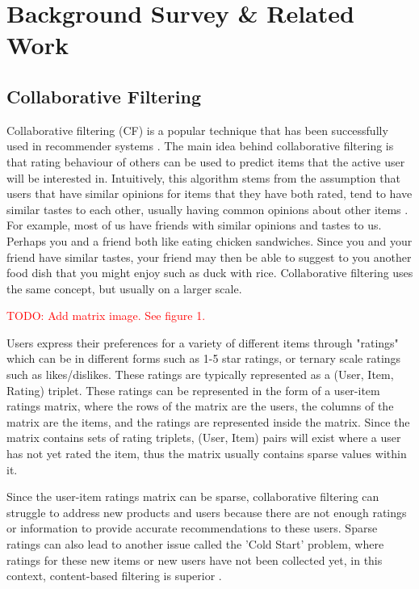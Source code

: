 \chapter{Background Survey \& Related Work}\label{C:background}

\section{Collaborative Filtering}

Collaborative filtering (CF) is a popular technique that has been successfully used in recommender systems \cite{itembased, schafer2007collaborative, survey}. The main idea behind collaborative filtering is that rating behaviour of others can be used to predict items that the active user will be interested in. Intuitively, this algorithm stems from the assumption that users that have similar opinions for items that they have both rated, tend to have similar tastes to each other, usually having common opinions about other items  \cite{schafer2007collaborative}. For example, most of us have friends with similar opinions and tastes to us. Perhaps you and a friend both like eating chicken sandwiches. Since you and your friend have similar tastes, your friend may then be able to suggest to you another food dish that you might enjoy such as duck with rice. Collaborative filtering uses the same concept, but usually on a larger scale. 

\textcolor{red}{TODO: Add matrix image. See figure 1.}

Users express their preferences for a variety of different items through "ratings" which can be in different forms such as 1-5 star ratings, or ternary scale ratings such as likes/dislikes. These ratings are typically represented as a (User, Item, Rating) triplet. These ratings can be represented in the form of a user-item ratings matrix, where the rows of the matrix are the users, the columns of the matrix are the items, and the ratings are represented inside the matrix. Since the matrix contains sets of rating triplets, (User, Item) pairs will exist where a user has not yet rated the item, thus the matrix usually contains sparse values within it. 

Since the user-item ratings matrix can be sparse, collaborative filtering can struggle to address new products and users because there are not enough ratings or information to provide accurate recommendations to these users. Sparse ratings can also lead to another issue called the 'Cold Start' problem, where ratings for these new items or new users have not been collected yet, in this context, content-based filtering is superior \cite{koren2009matrix}.

